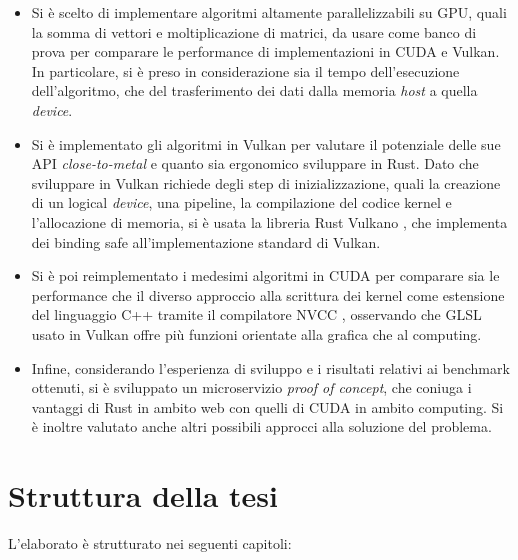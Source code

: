 \begin{itemize}
    \item Si è scelto di implementare algoritmi altamente parallelizzabili su \gls{GPU}, quali la somma di vettori e moltiplicazione di matrici, da usare come banco di prova per comparare le performance di implementazioni in \gls{CUDA} e Vulkan. In particolare, si è preso in considerazione sia il tempo dell'esecuzione dell'algoritmo, che del trasferimento dei dati dalla memoria \textit{host} a quella \textit{device}.
    \item Si è implementato gli algoritmi in Vulkan per valutare il potenziale delle sue \gls{API} \textit{close-to-metal} e quanto sia ergonomico sviluppare in Rust. Dato che sviluppare in Vulkan richiede degli step di inizializzazione, quali la creazione di un logical \textit{device}, una pipeline, la compilazione del codice kernel e l'allocazione di memoria, si è usata la libreria Rust Vulkano \cite[]{Rust:Vulkano}, che implementa dei binding safe all'implementazione standard di Vulkan.
    \item Si è poi reimplementato i medesimi algoritmi in \gls{CUDA} per comparare sia le performance che il diverso approccio alla scrittura dei kernel come estensione del linguaggio C++ tramite il compilatore \gls{NVCC} \cite[]{NVIDIA:nvcc}, osservando che GLSL \cite[]{KG:GLSL} usato in Vulkan offre più funzioni orientate alla grafica che al computing.
    \item Infine, considerando l'esperienza di sviluppo e i risultati relativi ai benchmark ottenuti, si è sviluppato un microservizio \textit{proof of concept}, che coniuga i vantaggi di Rust in ambito web con quelli di \gls{CUDA} in ambito computing. Si è inoltre valutato anche altri possibili approcci alla soluzione del problema.
\end{itemize}

\newpage

\section[Struttura della tesi]{Struttura della tesi}

L'elaborato è strutturato nei seguenti capitoli:


